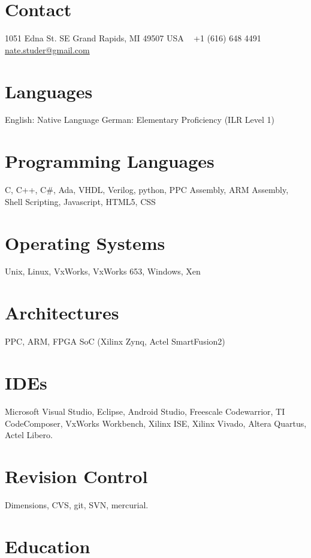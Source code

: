 \documentclass[print]{template/friggeri-cv} %
\begin{document}

\begin{aside} %
\section{Contact}
1051 Edna St. SE
Grand Rapids, MI 49507
USA
~
+1 (616) 648 4491
~
\href{mailto:nate.studer@gmail.com}{nate.studer@gmail.com}
\section{Languages}
English:  Native Language
German:  Elementary Proficiency (ILR Level 1)
\section{Programming Languages}
C, C++, C\#, Ada, VHDL, Verilog, python, PPC Assembly, ARM Assembly, Shell Scripting, Javascript, HTML5, CSS
\section{Operating Systems}
Unix, Linux, VxWorks, VxWorks 653, Windows, Xen
\section{Architectures}
PPC, ARM, FPGA SoC (Xilinx Zynq, Actel SmartFusion2)
\section{IDEs}
Microsoft Visual Studio, Eclipse, Android Studio, Freescale Codewarrior, TI CodeComposer, VxWorks Workbench, Xilinx ISE, Xilinx Vivado, Altera Quartus, Actel Libero.
\section{Revision Control}
Dimensions, CVS, git, SVN, mercurial.
\end{aside}

\section{Education}
\end{document}
